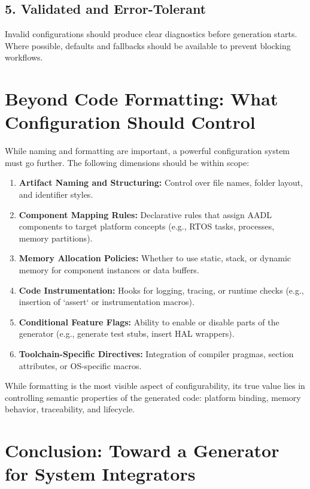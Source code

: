 \subsection*{5. Validated and Error-Tolerant}

Invalid configurations should produce clear diagnostics before generation starts. Where possible, defaults and fallbacks should be available to prevent blocking workflows.

\section{Beyond Code Formatting: What Configuration Should Control}
\label{sec:config_scope}

While naming and formatting are important, a powerful configuration system must go further. The following dimensions should be within scope:

\begin{enumerate}
	\item \textbf{Artifact Naming and Structuring:} Control over file names, folder layout, and identifier styles.
	\item \textbf{Component Mapping Rules:} Declarative rules that assign AADL components to target platform concepts (e.g., RTOS tasks, processes, memory partitions).
	\item \textbf{Memory Allocation Policies:} Whether to use static, stack, or dynamic memory for component instances or data buffers.
	\item \textbf{Code Instrumentation:} Hooks for logging, tracing, or runtime checks (e.g., insertion of `assert` or instrumentation macros).
	\item \textbf{Conditional Feature Flags:} Ability to enable or disable parts of the generator (e.g., generate test stubs, insert HAL wrappers).
	\item \textbf{Toolchain-Specific Directives:} Integration of compiler pragmas, section attributes, or OS-specific macros.
\end{enumerate}

\begin{tcolorbox}[colback=blue!5, colframe=blue!50!black, title=Configuration is More Than Style]
	While formatting is the most visible aspect of configurability, its true value lies in controlling semantic properties of the generated code: platform binding, memory behavior, traceability, and lifecycle.
\end{tcolorbox}

\section{Conclusion: Toward a Generator for System Integrators}
\label{sec:conclusion_configurable_generation}

